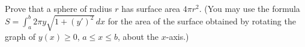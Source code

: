 Prove that a sphere of radius $r$ has surface area $4\pi r^2$. (You may use the formula $S=\displaystyle\int_a^b2\pi y\sqrt{1+\left(y'\right)^2}\,dx$ for the area of the surface obtained by rotating the graph of $y(x)\ge0$, $a\le x\le b$, about the $x$-axis.)
